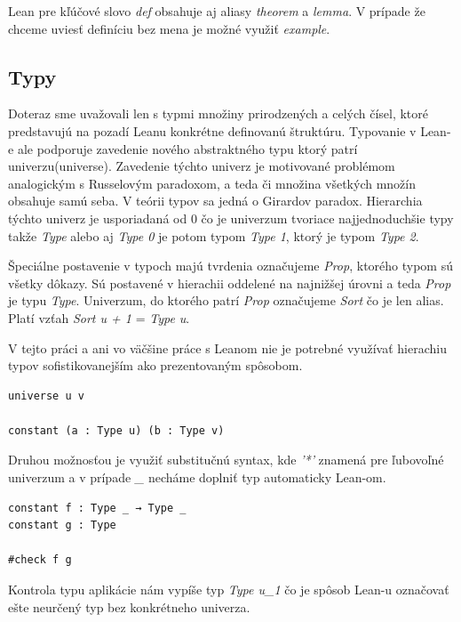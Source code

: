 \documentclass[a4paper,10pt,oneside]{report}%
\begin{document}
    Lean pre kľúčové slovo \emph{def} obsahuje aj aliasy \emph{theorem} a \emph{lemma}.
V prípade že chceme uviesť definíciu bez mena je možné využiť \emph{example}.

\subsection{Typy}
    Doteraz sme uvažovali len s typmi množiny prirodzených a celých čísel,
ktoré predstavujú na pozadí Leanu konkrétne definovanú štruktúru.
    Typovanie v Lean-e ale podporuje zavedenie nového abstraktného typu ktorý patrí univerzu(universe).
    Zavedenie týchto univerz je motivované problémom analogickým s Russelovým paradoxom,
a teda či množina všetkých množín obsahuje samú seba.
    V teórii typov sa jedná o Girardov paradox.
    Hierarchia týchto univerz je usporiadaná od 0 čo je univerzum tvoriace najjednoduchšie
typy takže \emph{Type} alebo aj \emph{Type 0} je potom typom \emph{Type 1}, ktorý
je typom \emph{Type 2}.

    Špeciálne postavenie v typoch majú tvrdenia označujeme \emph{Prop}, ktorého
typom sú všetky dôkazy.
    Sú postavené v hierachii oddelené na najnižšej úrovni a teda \emph{Prop} je 
typu \emph{Type}.
    Univerzum, do ktorého patrí \emph{Prop} označujeme \emph{Sort} čo je len 
alias.
Platí vzťah \emph{Sort u + 1} = \emph{Type u}.

V tejto práci a ani vo väčšine práce s Leanom nie je potrebné využívať hierachiu
    typov sofistikovanejším ako prezentovaným spôsobom.
\begin{lstlisting}
universe u v

constant (a : Type u) (b : Type v)
\end{lstlisting}
Druhou možnosťou je využiť substitučnú syntax, kde \emph{'*'} znamená pre ľubovoľné univerzum
a v prípade \emph{\_} necháme doplniť typ automaticky Lean-om.
\begin{lstlisting}
constant f : Type _ → Type _
constant g : Type

#check f g
\end{lstlisting}
    Kontrola typu aplikácie nám vypíše typ \emph{Type u\_1} čo je spôsob Lean-u označovať
ešte neurčený typ bez konkrétneho univerza.
\end{document}
